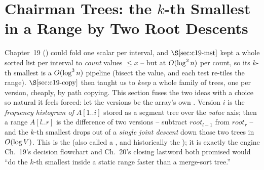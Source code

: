 \section{Chairman Trees: the \(k\)-th Smallest in a Range by Two Root Descents}\label{sec:c19-chairman}

\begin{previouslybox}
Chapter~19 () could fold one scalar per interval, and \(\secref{c19-mst}\) kept a whole sorted list per interval to \emph{count} values \(\le x\) -- but at \(O(\log^2 n)\) per count, so its \(k\)-th smallest is a \(O(\log^3 n)\) pipeline (bisect the value, and each test re-tiles the range). \(\secref{c19-copy}\) then taught us to \emph{keep} a whole family of trees, one per version, cheaply, by path copying. This section fuses the two ideas with a choice so natural it feels forced: let the versions be the array's own . Version \(i\) is the \emph{frequency histogram of \(A[1..i]\)} stored as a segment tree over the \emph{value} axis; then a range \(A[l..r]\) is the difference of two versions -- subtract \(\mathit{root}_{l-1}\) from \(\mathit{root}_r\) -- and the \(k\)-th smallest drops out of a \emph{single joint descent} down those two trees in \(O(\log V)\). This is the  (also called a , and historically the ); it is exactly the engine Ch.~19's decision flowchart and Ch.~20's closing lastword both promised would ``do the \(k\)-th smallest inside a static range faster than a merge-sort tree.''
\end{previouslybox}

